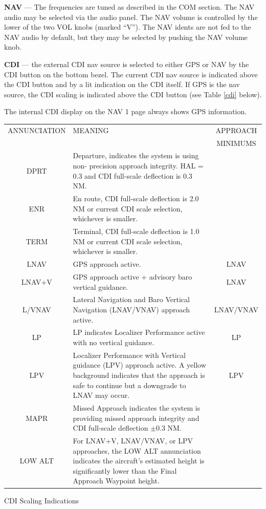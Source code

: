 \textbf{NAV} --- The frequencies are tuned as described in the COM section. The NAV audio may be selected via the audio panel. The NAV volume is controlled by the lower of the two VOL knobs (marked ``V''). The NAV idents are not fed to the NAV audio by default, but they may be selected by pushing the NAV volume knob.

\textbf{CDI} --- the external CDI nav source is selected to either GPS or NAV by the CDI button on the bottom bezel. The current CDI nav source is indicated above the CDI button and by a lit indication on the CDI itself. If GPS is the nav source, the CDI scaling is indicated above the CDI button (see Table \ref{cdi} below).

\begin{Note}
\centering
The internal CDI display on the NAV 1 page always shows GPS information.
\end{Note}
\raggedright

\begin{center}
\begin{tabularx}
  {\textwidth}{|c|X|c|}
  \hline ANNUNCIATION&MEANING&APPROACH\tabularnewline
  &&MINIMUMS\\
	\hline
	\hline DPRT & Departure, indicates the system is using non- precision approach integrity. HAL = 0.3 and CDI full-scale deflection is 0.3 NM.&\\
	\hline ENR & En route, CDI full-scale deflection is 2.0 NM or current CDI scale selection, whichever is smaller.&\\
	\hline TERM & Terminal, CDI full-scale deflection is 1.0 NM or current CDI scale selection, whichever is smaller.&\\
	\hline LNAV & GPS approach active. &LNAV\\
	\hline LNAV+V & GPS approach active + advisory baro vertical guidance.&LNAV\\
	\hline L/VNAV & Lateral Navigation and Baro Vertical Navigation (LNAV/VNAV) approach active. &LNAV/VNAV\\
	\hline LP & LP indicates Localizer Performance active with no vertical guidance.&LP\\
	\hline LPV & Localizer Performance with Vertical guidance (LPV) approach active.	A yellow background indicates that the approach is safe to continue but a downgrade to LNAV may occur.&LPV\\
	\hline MAPR & Missed Approach indicates the system is providing missed approach integrity and CDI full-scale deflection $\pm $0.3 NM.&\\
  \hline LOW ALT & For LNAV+V, LNAV/VNAV, or LPV approaches, the LOW ALT annunciation indicates the aircraft's estimated height is significantly lower than the Final Approach Waypoint height.&\\
	\hline
\end{tabularx}
\caption{CDI Scaling Indications} \label{cdi}
\end{center}

